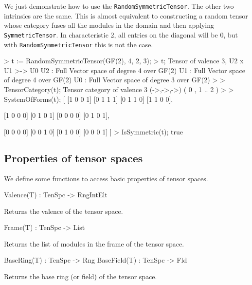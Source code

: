 \begin{example}[RandomSymTen]

We just demonstrate how to use the \texttt{RandomSymmetricTensor}. The other two
intrinsics are the same. This is almost equivalent to constructing a random
tensor whose category fuses all the modules in the domain and then applying
\texttt{SymmetricTensor}. In characteristic 2, all entries on the diagonal will
be 0, but with \texttt{RandomSymmetricTensor} this is not the case.
\begin{code}
> t := RandomSymmetricTensor(GF(2), 4, 2, 3);
> t;
Tensor of valence 3, U2 x U1 >-> U0
U2 : Full Vector space of degree 4 over GF(2)
U1 : Full Vector space of degree 4 over GF(2)
U0 : Full Vector space of degree 3 over GF(2)
> 
> TensorCategory(t);
Tensor category of valence 3 (->,->,->) ({ 0 },{ 1 .. 2 })
> 
> SystemOfForms(t);
[
    [1 0 0 1]
    [0 1 1 1]
    [0 1 1 0]
    [1 1 0 0],

    [1 0 0 0]
    [0 1 0 1]
    [0 0 0 0]
    [0 1 0 1],

    [0 0 0 0]
    [0 0 1 0]
    [0 1 0 0]
    [0 0 0 1]
]
> IsSymmetric(t);
true
\end{code}
\end{example}

\subsection{Properties of tensor spaces}

We define some functions to access basic properties of tensor spaces.

\begin{intrinsics}
Valence(T) : TenSpc -> RngIntElt
\end{intrinsics}

Returns the valence of the tensor space.

\begin{intrinsics}
Frame(T) : TenSpc -> List
\end{intrinsics}

Returns the list of modules in the frame of the tensor space.

\begin{intrinsics}
BaseRing(T) : TenSpc -> Rng
BaseField(T) : TenSpc -> Fld
\end{intrinsics}

Returns the base ring (or field) of the tensor space.

